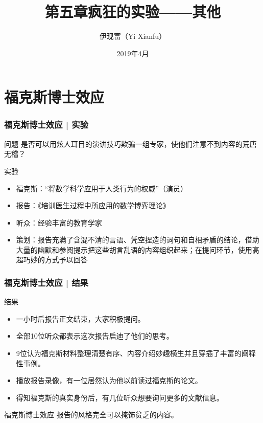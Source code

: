 



\title[其他]{第五章\quad 疯狂的实验——其他}
\author[Yixf]{伊现富（Yi Xianfu）}
\date{2019年4月}



\section{福克斯博士效应}
\begin{frame}
  \frametitle{福克斯博士效应 | 实验}
  \begin{block}{问题}
 是否可以用炫人耳目的演讲技巧欺骗一组专家，使他们注意不到内容的荒唐无稽？ 
  \end{block}
  \pause
  \begin{block}{实验}
    \begin{itemize}
      \item 福克斯：“将数学科学应用于人类行为的权威”（演员）
      \item 报告：《培训医生过程中所应用的数学博弈理论》
      \item 听众：经验丰富的教育学家
      \item 策划：报告充满了含混不清的言语、凭空捏造的词句和自相矛盾的结论，借助大量的幽默和参阅提示把这些胡言乱语的内容组织起来；在提问环节，使用高超巧妙的方式予以回答
    \end{itemize}
  \end{block}
\end{frame}

\begin{frame}
  \frametitle{福克斯博士效应 | 结果}
  \begin{block}{结果}
    \begin{itemize}
      \item 一小时后报告正文结束，大家积极提问。
      \item 全部10位听众都表示这次报告启迪了他们的思考。
      \item 9位认为福克斯材料整理清楚有序、内容介绍妙趣横生并且穿插了丰富的阐释性事例。
      \item 播放报告录像，有一位居然认为他以前读过福克斯的论文。
      \item 得知福克斯的真实身份后，有几位听众想要询问更多的文献信息。
    \end{itemize}
  \end{block}
  \pause
  \begin{block}{\alert{福克斯博士效应}}
    报告的风格完全可以掩饰贫乏的内容。
  \end{block}
\end{frame}

